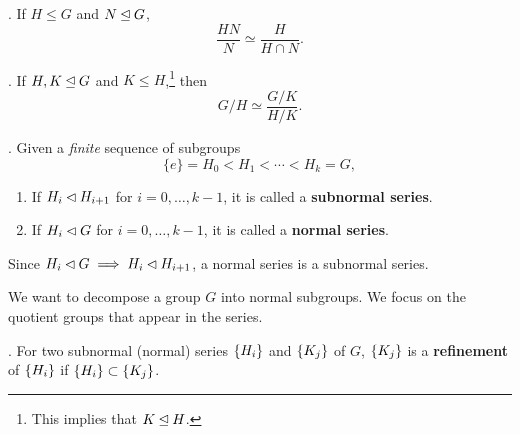 \thm.  If \(H \leq G\) and \(N \unlhd G\),
\[
    \frac{HN}{N} \simeq \frac{H}{H\cap N}.
\]
\begin{center}
\end{center}

\thm.  If \(H, K \unlhd G\) and \(K \leq H\),\footnote{This implies that \(K \unlhd H\).} then
\[
    G/H \simeq \frac{G/K}{H/K}.
\]


. Given a \textit{finite} sequence of subgroups
\[
    \{e\} = H_0 < H_1 < \cdots < H_k = G,
\]
\begin{enumerate}
    \item {} If \(H_i \lhd H_{i+1}\) for \(i = 0, \dots, k - 1\), it is called a \textbf{subnormal series}.
    \item {} If \(H_i \lhd G\) for \(i = 0, \dots, k - 1\), it is called a \textbf{normal series}.
\end{enumerate}

\rmk Since \(H_i \lhd G \implies H_i \lhd H_{i+1}\), a normal series is a subnormal series.

We want to decompose a group \(G\) into normal subgroups. We focus on the quotient groups that appear in the series.

.  For two subnormal (normal) series \(\left\{ H_i \right\}\) and \(\left\{ K_j \right\}\) of \(G\), \(\left\{ K_j \right\}\) is a \textbf{refinement} of \(\left\{ H_i \right\}\) if \(\left\{ H_i \right\} \subset \left\{ K_j \right\}\).


